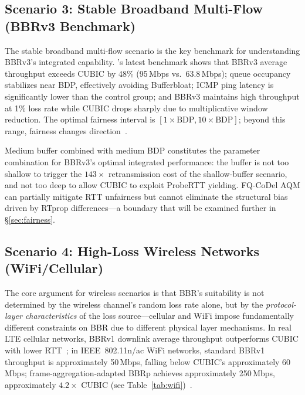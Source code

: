 \documentclass[a4paper,fleqn]{cas-sc}
\begin{document}
\FloatBarrier

\subsection{Scenario 3: Stable Broadband Multi-Flow (BBRv3 Benchmark)}
\label{sec:bbr3}

The stable broadband multi-flow scenario is the key benchmark for understanding
BBRv3's integrated capability. \citet{gomez2024bbrv3}'s latest benchmark shows
that BBRv3 average throughput exceeds CUBIC by 48\% (95\,Mbps vs.\ 63.8\,Mbps);
queue occupancy stabilizes near BDP, effectively avoiding Bufferbloat; ICMP ping
latency is significantly lower than the control group; and BBRv3 maintains high
throughput at 1\% loss rate while CUBIC drops sharply due to multiplicative window
reduction. The optimal fairness interval is $[1\times\text{BDP},10\times\text{BDP}]$;
beyond this range, fairness changes direction~\citep{gomez2024bbrv3}.

Medium buffer combined with medium BDP constitutes the parameter combination for
BBRv3's optimal integrated performance: the buffer is not too shallow to trigger
the $143\times$ retransmission cost of the shallow-buffer scenario, and not too
deep to allow CUBIC to exploit ProbeRTT yielding. FQ-CoDel AQM can partially
mitigate RTT unfairness but cannot eliminate the structural bias driven by RTprop
differences---a boundary that will be examined further in \S\ref{sec:fairness}.

\subsection{Scenario 4: High-Loss Wireless Networks (WiFi/Cellular)}
\label{sec:wireless_loss}

The core argument for wireless scenarios is that BBR's suitability is not
determined by the wireless channel's random loss rate alone, but by the
\emph{protocol-layer characteristics} of the loss source---cellular and WiFi
impose fundamentally different constraints on BBR due to different physical layer
mechanisms. In real LTE cellular networks, BBRv1 downlink average throughput
outperforms CUBIC with lower RTT~\citep{atxutegi2018cellular}; in IEEE~802.11n/ac
WiFi networks, standard BBRv1 throughput is approximately 50\,Mbps, falling below
CUBIC's approximately 60\,Mbps; frame-aggregation-adapted BBRp achieves
approximately 250\,Mbps, approximately $4.2\times$ CUBIC (see
Table~\ref{tab:wifi})~\citep{grazia2020bbrp}.
\end{document}
